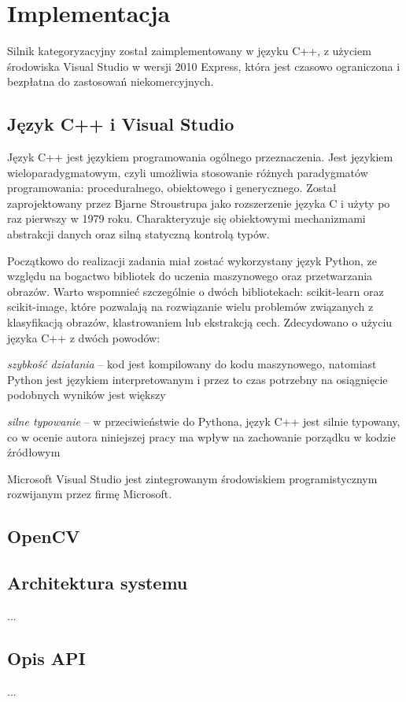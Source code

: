 \chapter{Implementacja}

Silnik kategoryzacyjny został zaimplementowany w języku C++, z użyciem środowiska Visual Studio w wersji 2010 Express, która jest czasowo ograniczona i bezpłatna do zastosowań niekomercyjnych.

\section{Język C++ i Visual Studio}

Język C++ jest językiem programowania ogólnego przeznaczenia. Jest językiem wieloparadygmatowym, czyli umożliwia stosowanie różnych paradygmatów programowania: proceduralnego, obiektowego i generycznego. Został zaprojektowany przez Bjarne Stroustrupa jako rozszerzenie języka C i użyty po raz pierwszy w 1979 roku. Charakteryzuje się obiektowymi mechanizmami abstrakcji danych oraz silną statyczną kontrolą typów.

Początkowo do realizacji zadania miał zostać wykorzystany język Python, ze względu na bogactwo bibliotek do uczenia maszynowego oraz przetwarzania obrazów. Warto wspomnieć szczególnie o dwóch bibliotekach: scikit-learn oraz scikit-image, które pozwalają na rozwiązanie wielu problemów związanych z klasyfikacją obrazów, klastrowaniem lub ekstrakcją cech. Zdecydowano o użyciu języka C++ z dwóch powodów:

\begin{compactitem}
	\item \emph{szybkość działania} -- kod jest kompilowany do kodu maszynowego, natomiast Python jest językiem interpretowanym i przez to czas potrzebny na osiągnięcie podobnych wyników jest większy
	\item \emph{silne typowanie} -- w przeciwieństwie do Pythona, język C++ jest silnie typowany, co w ocenie autora niniejszej pracy ma wpływ na zachowanie porządku w kodzie źródłowym
\end{compactitem}

Microsoft Visual Studio jest zintegrowanym środowiskiem programistycznym rozwijanym przez firmę Microsoft. 

\section{OpenCV}




\section{Architektura systemu}
...

\section{Opis API}
...